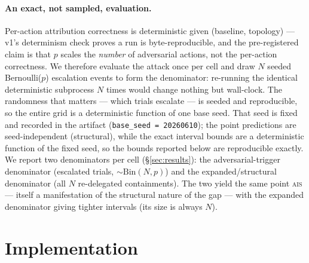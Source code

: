 \documentclass[11pt]{article}
\newcommand{\ais}{\textsc{ais}}
\newcommand{\code}[1]{\texttt{#1}}
\begin{document}
\paragraph{An exact, not sampled, evaluation.} Per-action attribution
correctness is deterministic given (baseline, topology) --- v1's determinism
check proves a run is byte-reproducible, and the pre-registered claim is that
$p$ scales the \emph{number} of adversarial actions, not the per-action
correctness. We therefore evaluate the attack once per cell and draw $N$
seeded Bernoulli($p$) escalation events to form the denominator: re-running
the identical deterministic subprocess $N$ times would change nothing but
wall-clock. The randomness that matters --- which trials escalate --- is
seeded and reproducible, so the entire grid is a deterministic function of
one base seed. That seed is fixed and recorded in the artifact
(\code{base\_seed = 20260610}); the point predictions are seed-independent
(structural), while the exact interval bounds are a deterministic function of
the fixed seed, so the bounds reported below are reproducible exactly. We
report two denominators per cell (\S\ref{sec:results}): the adversarial-trigger
denominator (escalated trials, $\sim\!\mathrm{Bin}(N,p)$) and the
expanded/structural denominator (all $N$ re-delegated containments). The two
yield the same point \ais{} --- itself a manifestation of the structural nature
of the gap --- with the expanded denominator giving tighter intervals (its
size is always $N$).

\section{Implementation}
\label{sec:impl}
\end{document}
